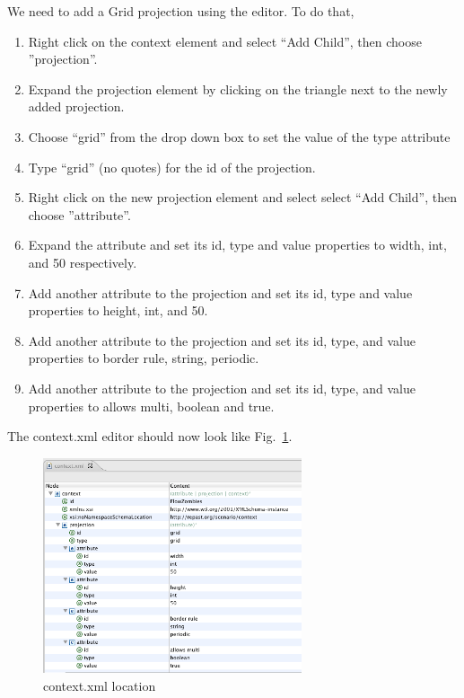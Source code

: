 \documentclass[11pt]{amsart}
\begin{document}
We need to add a Grid projection using the editor.  To do that, 
\vspace{.2in}
\begin{enumerate}
\item Right click on the context element and select ``Add Child'', then choose ''projection''.
\item Expand the projection element by clicking on the triangle next to the newly added projection.
\item Choose ``grid'' from the drop down box to set the value of the type attribute
\item Type ``grid'' (no quotes) for the id of the projection.
\item Right click on the new projection element and select select ``Add Child'', then choose ''attribute''.
\item Expand the attribute and set its id, type and value properties to width, int, and 50 respectively.
\item Add another attribute to the projection and set its id, type and value properties to height, int, and 50.
\item Add another attribute to the projection and set its id, type, and value properties to border rule, string, periodic.
\item Add another attribute to the projection and set its id, type, and value properties to allows multi, boolean and true.
\end{enumerate}

The context.xml editor should now look like Fig.~\ref{fig:context}.

\begin{figure}[h]
\begin{center}
\vspace{.2in}
\centerline {
\includegraphics[width=3in]{figs/context.png}
}
\caption{context.xml location}
\label{fig:context}
\end{center}
\end{figure}
\end{document}
